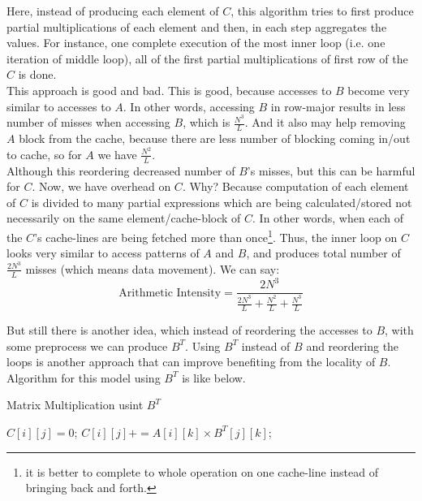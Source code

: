 \documentclass[paper=a4, fontsize=11pt]{scrartcl} %
\numberwithin{equation}{section} %
\numberwithin{figure}{section} %
\numberwithin{table}{section} %
\begin{document}
Here, instead of producing each element of $C$, this algorithm tries to first produce partial multiplications of each element and then, in each step aggregates the values. For instance, one complete execution of the most inner loop (i.e. one iteration of middle loop), all of the first partial multiplications of first row of the $C$ is done.\\
This approach is good and bad. This is good, because accesses to $B$ become very similar to accesses to $A$. In other words, accessing $B$ in row-major results in less number of misses when accessing $B$, which is $\frac{N^{3}}{L}$. And it also may help removing $A$ block from the cache, because there are less number of blocking coming in/out to cache, so for $A$ we have $\frac{N^{2}}{L}$.\\
Although this reordering decreased number of $B$'s misses, but this can be harmful for $C$. Now, we have overhead on $C$. Why? Because computation of each element of $C$ is divided to many partial expressions which are being calculated/stored not necessarily on the same element/cache-block of $C$. In other words, when each of the $C$'s cache-lines are being fetched more than once\footnote{it is better to complete to whole operation on one cache-line instead of bringing back and forth.}. Thus, the inner loop on $C$ looks very similar to access patterns of $A$ and $B$, and produces total number of $\frac{2N^{3}}{L}$ misses (which means data movement). We can say:
\begin{equation*}
\text{Arithmetic Intensity} = \frac{2N^{3}}{ \frac{2N^{3}}{L} + \frac{N^{2}}{L} + \frac{N^{3}}{L} }
\end{equation*}

But still there is another idea, which instead of reordering the accesses to $B$, with some preprocess we can produce $B^{T}$. Using $B^{T}$ instead of $B$ and reordering the loops is another approach that can improve benefiting from the locality of $B$. Algorithm for this model using $B^{T}$ is like below.\\

\begin{algorithm}
\caption{Matrix Multiplication usint $B^{T}$}
\label{Transpose-Alg}
\begin{algorithmic}
		\State $C[ i ][ j ] = 0$;
		\State $C[ i ][ j ] += A[ i ][ k ] \times B^{T}[ j ][ k ]$; 
		\EndFor
	\EndFor
\EndFor
\end{algorithmic}
\end{algorithm}
\end{document}
